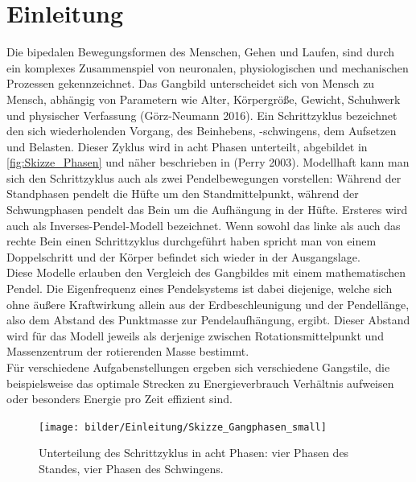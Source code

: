 \section{Einleitung}

Die bipedalen Bewegungsformen des Menschen, Gehen und Laufen, sind durch ein komplexes Zusammenspiel von neuronalen, physiologischen und mechanischen Prozessen gekennzeichnet. 
Das Gangbild unterscheidet sich von Mensch zu Mensch, abhängig von Parametern wie Alter, Körpergröße, Gewicht, Schuhwerk und physischer Verfassung (Görz-Neumann 2016). 
Ein Schrittzyklus bezeichnet den sich wiederholenden Vorgang, des Beinhebens, -schwingens, dem Aufsetzen und Belasten. Dieser Zyklus wird in acht Phasen unterteilt, abgebildet in \autoref{fig:Skizze_Phasen} und näher beschrieben in (Perry 2003). Modellhaft kann man sich den Schrittzyklus auch als zwei Pendelbewegungen vorstellen: Während der Standphasen pendelt die Hüfte um den Standmittelpunkt, während der Schwungphasen pendelt das Bein um die Aufhängung in der Hüfte. Ersteres wird auch als Inverses-Pendel-Modell bezeichnet.
Wenn sowohl das linke als auch das rechte Bein einen Schrittzyklus durchgeführt haben spricht man von einem Doppelschritt und der Körper befindet sich wieder in der Ausgangslage.\\
Diese Modelle erlauben den Vergleich des Gangbildes mit einem mathematischen Pendel. Die Eigenfrequenz eines Pendelsystems ist dabei diejenige, welche sich ohne äußere Kraftwirkung allein aus der Erdbeschleunigung und der Pendellänge, also dem Abstand des Punktmasse zur Pendelaufhängung, ergibt. Dieser Abstand wird für das Modell jeweils als derjenige zwischen Rotationsmittelpunkt und Massenzentrum der rotierenden Masse bestimmt.\\
Für verschiedene Aufgabenstellungen ergeben sich verschiedene Gangstile, die beispielsweise das optimale Strecken zu Energieverbrauch Verhältnis aufweisen oder besonders Energie pro Zeit effizient sind.\\
\begin{figure}[h!]
	\centering
	\texttt{[image: bilder/Einleitung/Skizze\_Gangphasen\_small]}
	\caption[Gangphasen]{Unterteilung des Schrittzyklus in acht Phasen: vier Phasen des Standes, vier Phasen des Schwingens.}
	\label{fig:Skizze_Phasen}
\end{figure}

